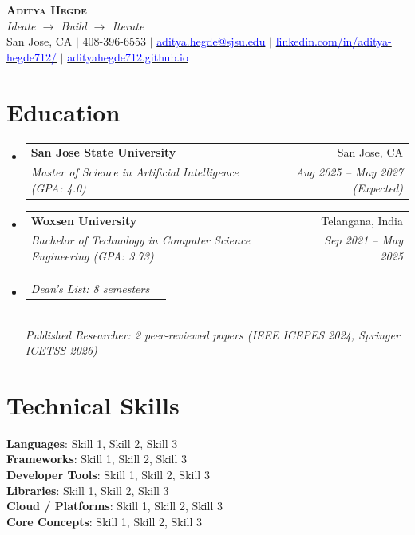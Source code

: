 \documentclass[letterpaper,11pt]{article}
\makeatletter
\newcommand{\resumeSubheading}[4]{
  \vspace{-2pt}\item
    \begin{tabular*}{0.97\textwidth}[t]{l@{\extracolsep{\fill}}r}
      \textbf{#1} & #2 \\
      \textit{\small#3} & \textit{\small #4} \\
    \end{tabular*}\vspace{-7pt}
}
\newcommand{\resumeSubSubheading}[2]{
    \vspace{-2pt}\item
    \begin{tabular*}{0.97\textwidth}{l@{\extracolsep{\fill}}r}
      \textit{\small#1} & \textit{\small #2} \\
    \end{tabular*}\vspace{-6pt}
}
\newcommand{\resumeSubHeadingListStart}{\begin{itemize}[leftmargin=0.15in, label={}]}
\newcommand{\resumeSubHeadingListEnd}{\end{itemize}}
\makeatother
\begin{document}
\textcolor{blue}{\tiny }
\begin{center}
    \vspace{-35pt}
    \textbf{\Huge \scshape Aditya Hegde} \\ \vspace{1pt}
    {\small \textit{Ideate $\rightarrow$ Build $\rightarrow$ Iterate}} \\ \vspace{2pt}
    \small San Jose, CA 
    $|$ 408-396-6553 
    $|$ \href{mailto:aditya.hegde@sjsu.edu}{\textcolor{blue}{aditya.hegde@sjsu.edu}} 
    $|$ \href{https://www.linkedin.com/in/aditya-hegde712} {\textcolor{blue}{linkedin.com/in/aditya-hegde712/}}
    $|$ \href{https://adityahegde712.github.io/}{\textcolor{blue}{adityahegde712.github.io}}
\end{center}

\section{\textbf{Education}}
  \resumeSubHeadingListStart
    \resumeSubheading
      {San Jose State University}{San Jose, CA}
      {Master of Science in Artificial Intelligence (GPA: 4.0)}{Aug 2025 -- May 2027 (Expected)}
    \vspace{-3pt}
    \resumeSubheading
      {Woxsen University}{Telangana, India}
      {Bachelor of Technology in Computer Science Engineering (GPA: 3.73)}{Sep 2021 -- May 2025}
      \vspace{-8pt}
      \resumeSubSubheading
      {Dean's List: 8 semesters}{}\\
      \vspace{2pt}
      \textit{\small Published Researcher: 2 peer-reviewed papers (IEEE ICEPES 2024, Springer ICETSS 2026)}
  \resumeSubHeadingListEnd

\section{\textbf{Technical Skills}}
 \begin{itemize}[leftmargin=0.15in, label={}]
    \small{\item{
     \textbf{Languages}{: Skill 1, Skill 2, Skill 3} \\
     \textbf{Frameworks}{: Skill 1, Skill 2, Skill 3} \\
     \textbf{Developer Tools}{: Skill 1, Skill 2, Skill 3}\\
     \textbf{Libraries}{: Skill 1, Skill 2, Skill 3}\\
     \textbf{Cloud / Platforms}{: Skill 1, Skill 2, Skill 3}\\
     \textbf{Core Concepts}{: Skill 1, Skill 2, Skill 3}
    }}
 \end{itemize}
\end{document}
